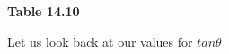     \begin{center}{\small\bfseries Table 14.10}\end{center}
    \par
        \label{m39414*id89576}Let us look back at our values for $tan\theta $\par 
    \setlength\mytablespace{14\tabcolsep}
    \addtolength\mytablespace{8\arrayrulewidth}
    \setlength\mytablewidth{\linewidth}
    \setlength\mytableroom{\mytablewidth}
    \addtolength\mytableroom{-\mytablespace}
    \setlength\myfixedwidth{0pt}
    \setlength\mystarwidth{\mytableroom}
        \addtolength\mystarwidth{-\myfixedwidth}
        \divide{}
